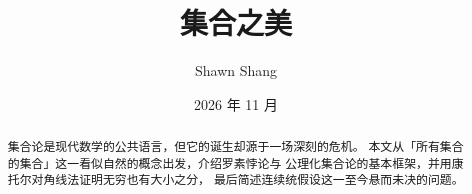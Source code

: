 \documentclass[lang=cn,11pt]{elegantpaper}
\title{集合之美}
\author{Shawn Shang}
\institute{数学教研组}
\date{2026 年 11 月}
\begin{document}
\maketitle

\begin{abstract}
集合论是现代数学的公共语言，但它的诞生却源于一场深刻的危机。
本文从「所有集合的集合」这一看似自然的概念出发，介绍罗素悖论与
公理化集合论的基本框架，并用康托尔对角线法证明无穷也有大小之分，
最后简述连续统假设这一至今悬而未决的问题。
\end{abstract}


\tableofcontents
\newpage



\printbibliography
\end{document}
